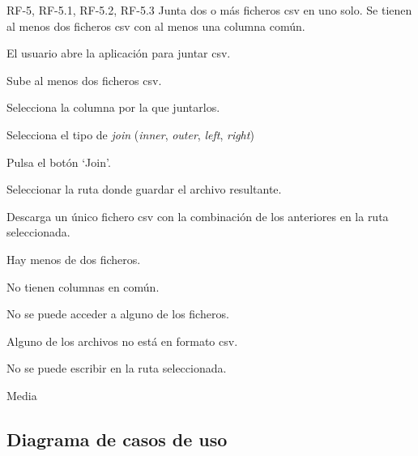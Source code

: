 
{RF-5, RF-5.1, RF-5.2, RF-5.3}
{Junta dos o más ficheros csv en uno solo.}
{Se tienen al menos dos ficheros csv con al menos una columna común.}
{
	\item El usuario abre la aplicación para juntar csv.
	\item Sube al menos dos ficheros csv.
	\item Selecciona la columna por la que juntarlos.
	\item Selecciona el tipo de \textit{join} (\textit{inner}, \textit{outer}, \textit{left}, \textit{right})
	\item Pulsa el botón `Join'.
	\item Seleccionar la ruta donde guardar el archivo resultante.
}
{Descarga un único fichero csv con la combinación de los anteriores en la ruta seleccionada.}
{
	\item Hay menos de dos ficheros.
	\item No tienen columnas en común.
	\item No se puede acceder a alguno de los ficheros.
	\item Alguno de los archivos no está en formato csv.
	\item No se puede escribir en la ruta seleccionada.
}
{Media}

\subsection{Diagrama de casos de uso}

